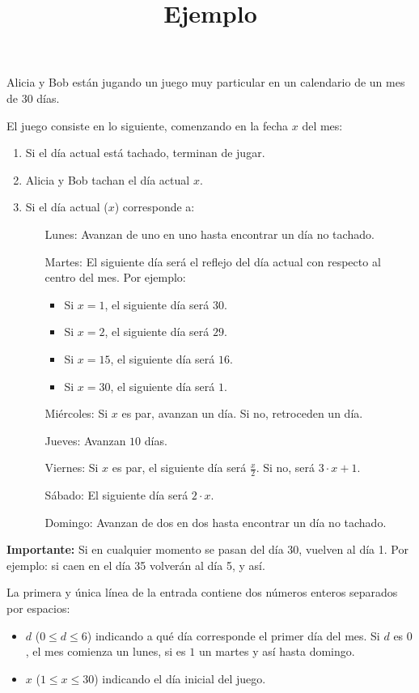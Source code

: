 \documentclass{oci}
\title{Ejemplo}
\begin{document}
\begin{problemDescription}
  Alicia y Bob están jugando un juego muy particular en un calendario de un mes de 30 días.

  El juego consiste en lo siguiente, comenzando en la fecha $x$ del mes:
  \begin{enumerate}
    \item Si el día actual está tachado, terminan de jugar.
    \item Alicia y Bob tachan el día actual $x$.
    \item Si el día actual ($x$) corresponde a:
    \begin{itemize}
      \item[Lunes:] Avanzan de uno en uno hasta encontrar un día no tachado.
      \item[Martes:]  El siguiente día será el reflejo del día actual con respecto al centro del mes. Por ejemplo:
      \begin{itemize}
        \item Si $x=1$, el siguiente día será $30$.
        \item Si $x=2$, el siguiente día será $29$.
        \item Si $x=15$, el siguiente día será $16$.
        \item Si $x=30$, el siguiente día será $1$.
      \end{itemize}
      \item[Miércoles:] Si $x$ es par, avanzan un día. Si no, retroceden un día.
      \item[Jueves:] Avanzan $10$ días.
      \item[Viernes:] Si $x$ es par, el siguiente día será $\frac{x}{2}$. Si no, será $3 \cdot x + 1$.
      \item[Sábado:] El siguiente día será $2 \cdot x$.
      \item[Domingo:] Avanzan de dos en dos hasta encontrar un día no tachado.
    \end{itemize}
  \end{enumerate}

  \textbf{Importante:} Si en cualquier momento se pasan del día 30, vuelven al día 1. Por ejemplo: si caen en el día 35 volverán al día 5, y así.

\end{problemDescription}

\begin{inputDescription}
  La primera y única línea de la entrada contiene dos números enteros separados por espacios:
  \begin{itemize}
    \item $d$ ($0 \leq d \leq 6$) indicando a qué día corresponde el primer día del mes. Si $d$ es $0$, el mes comienza un lunes, si es $1$ un martes y así hasta domingo.
    \item $x$ ($1 \leq x \leq 30$) indicando el día inicial del juego.
  \end{itemize}
\end{inputDescription}
\end{document}
